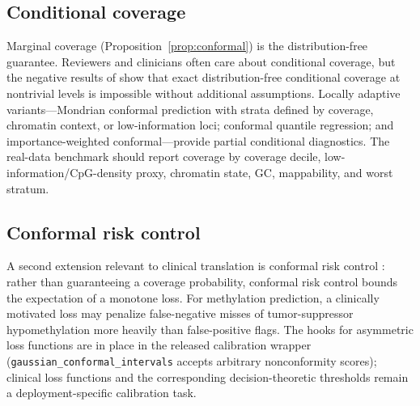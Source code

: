 \subsection{Conditional coverage}
\label{sec:calibration:cond}
Marginal coverage (Proposition~\ref{prop:conformal}) is the distribution-free guarantee. Reviewers and clinicians often care about conditional coverage, but the negative results of \citet{foygelbarber2021limits} show that exact distribution-free conditional coverage at nontrivial levels is impossible without additional assumptions. Locally adaptive variants---Mondrian conformal prediction with strata defined by coverage, chromatin context, or low-information loci; conformal quantile regression; and importance-weighted conformal---provide partial conditional diagnostics. The real-data benchmark should report coverage by coverage decile, low-information/CpG-density proxy, chromatin state, GC, mappability, and worst stratum.

\subsection{Conformal risk control}
A second extension relevant to clinical translation is conformal risk control \citep{angelopoulos2024crc}: rather than guaranteeing a coverage probability, conformal risk control bounds the expectation of a monotone loss. For methylation prediction, a clinically motivated loss may penalize false-negative misses of tumor-suppressor hypomethylation more heavily than false-positive flags. The hooks for asymmetric loss functions are in place in the released calibration wrapper (\texttt{gaussian\_conformal\_intervals} accepts arbitrary nonconformity scores); clinical loss functions and the corresponding decision-theoretic thresholds remain a deployment-specific calibration task.

